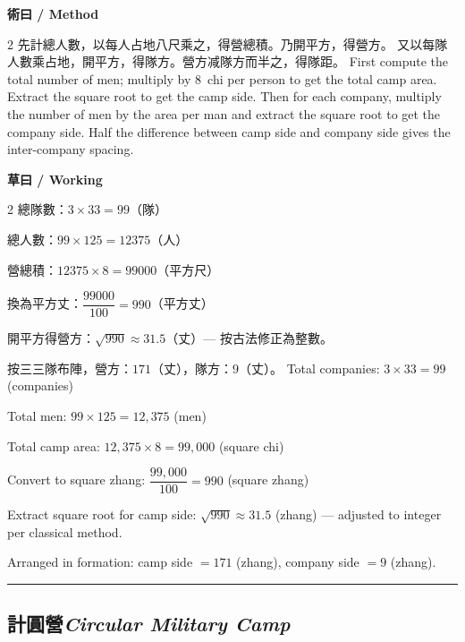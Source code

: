 \documentclass[11pt,a4paper]{article}
\newcommand{\bilingualsubsection}[2]{\subsection{#1\quad\textit{#2}}}
\newcommand{\longline}{\noindent\rule{\textwidth}{0.4pt}}
\begin{document}
\vspace{0.4em}
\noindent\textbf{\textcolor{chinesecolor}{術曰} / \textcolor{englishcolor}{Method}}
\vspace{0.2em}
\begin{paracol}{2}
先計總人數，以每人占地八尺乘之，得營總積。乃開平方，得營方。
又以每隊人數乘占地，開平方，得隊方。營方减隊方而半之，得隊距。
\switchcolumn
First compute the total number of men; multiply by 8~chi per person to get
the total camp area. Extract the square root to get the camp side. Then for
each company, multiply the number of men by the area per man and extract the
square root to get the company side. Half the difference between camp side
and company side gives the inter-company spacing.
\end{paracol}

\vspace{0.4em}
\noindent\textbf{\textcolor{chinesecolor}{草曰} / \textcolor{englishcolor}{Working}}
\vspace{0.2em}
\begin{paracol}{2}
總隊數：$3 \times 33 = 99$（隊）

總人數：$99 \times 125 = 12375$（人）

營總積：$12375 \times 8 = 99000$（平方尺）

換為平方丈：$\dfrac{99000}{100} = 990$（平方丈）

開平方得營方：$\sqrt{990} \approx 31.5$（丈）--- 按古法修正為整數。

按三三隊布陣，營方：$171$（丈），隊方：$9$（丈）。
\switchcolumn
Total companies: $3 \times 33 = 99$ (companies)

Total men: $99 \times 125 = 12{,}375$ (men)

Total camp area: $12{,}375 \times 8 = 99{,}000$ (square chi)

Convert to square zhang: $\dfrac{99{,}000}{100} = 990$ (square zhang)

Extract square root for camp side: $\sqrt{990} \approx 31.5$ (zhang) ---
adjusted to integer per classical method.

Arranged in formation: camp side $= 171$ (zhang), company side $= 9$ (zhang).
\end{paracol}

\vspace{0.5em}
\longline

\bilingualsubsection{計圓營}{Circular Military Camp}
\end{document}
